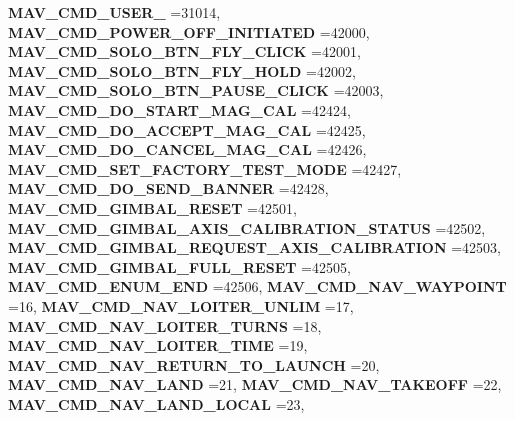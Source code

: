 \begin{DoxyCompactItemize}
\textbf{ M\+A\+V\+\_\+\+C\+M\+D\+\_\+\+U\+S\+E\+R\+\_} =31014, 
\newline
\textbf{ M\+A\+V\+\_\+\+C\+M\+D\+\_\+\+P\+O\+W\+E\+R\+\_\+\+O\+F\+F\+\_\+\+I\+N\+I\+T\+I\+A\+T\+ED} =42000, 
\textbf{ M\+A\+V\+\_\+\+C\+M\+D\+\_\+\+S\+O\+L\+O\+\_\+\+B\+T\+N\+\_\+\+F\+L\+Y\+\_\+\+C\+L\+I\+CK} =42001, 
\textbf{ M\+A\+V\+\_\+\+C\+M\+D\+\_\+\+S\+O\+L\+O\+\_\+\+B\+T\+N\+\_\+\+F\+L\+Y\+\_\+\+H\+O\+LD} =42002, 
\textbf{ M\+A\+V\+\_\+\+C\+M\+D\+\_\+\+S\+O\+L\+O\+\_\+\+B\+T\+N\+\_\+\+P\+A\+U\+S\+E\+\_\+\+C\+L\+I\+CK} =42003, 
\newline
\textbf{ M\+A\+V\+\_\+\+C\+M\+D\+\_\+\+D\+O\+\_\+\+S\+T\+A\+R\+T\+\_\+\+M\+A\+G\+\_\+\+C\+AL} =42424, 
\textbf{ M\+A\+V\+\_\+\+C\+M\+D\+\_\+\+D\+O\+\_\+\+A\+C\+C\+E\+P\+T\+\_\+\+M\+A\+G\+\_\+\+C\+AL} =42425, 
\textbf{ M\+A\+V\+\_\+\+C\+M\+D\+\_\+\+D\+O\+\_\+\+C\+A\+N\+C\+E\+L\+\_\+\+M\+A\+G\+\_\+\+C\+AL} =42426, 
\textbf{ M\+A\+V\+\_\+\+C\+M\+D\+\_\+\+S\+E\+T\+\_\+\+F\+A\+C\+T\+O\+R\+Y\+\_\+\+T\+E\+S\+T\+\_\+\+M\+O\+DE} =42427, 
\newline
\textbf{ M\+A\+V\+\_\+\+C\+M\+D\+\_\+\+D\+O\+\_\+\+S\+E\+N\+D\+\_\+\+B\+A\+N\+N\+ER} =42428, 
\textbf{ M\+A\+V\+\_\+\+C\+M\+D\+\_\+\+G\+I\+M\+B\+A\+L\+\_\+\+R\+E\+S\+ET} =42501, 
\textbf{ M\+A\+V\+\_\+\+C\+M\+D\+\_\+\+G\+I\+M\+B\+A\+L\+\_\+\+A\+X\+I\+S\+\_\+\+C\+A\+L\+I\+B\+R\+A\+T\+I\+O\+N\+\_\+\+S\+T\+A\+T\+US} =42502, 
\textbf{ M\+A\+V\+\_\+\+C\+M\+D\+\_\+\+G\+I\+M\+B\+A\+L\+\_\+\+R\+E\+Q\+U\+E\+S\+T\+\_\+\+A\+X\+I\+S\+\_\+\+C\+A\+L\+I\+B\+R\+A\+T\+I\+ON} =42503, 
\newline
\textbf{ M\+A\+V\+\_\+\+C\+M\+D\+\_\+\+G\+I\+M\+B\+A\+L\+\_\+\+F\+U\+L\+L\+\_\+\+R\+E\+S\+ET} =42505, 
\textbf{ M\+A\+V\+\_\+\+C\+M\+D\+\_\+\+E\+N\+U\+M\+\_\+\+E\+ND} =42506, 
\textbf{ M\+A\+V\+\_\+\+C\+M\+D\+\_\+\+N\+A\+V\+\_\+\+W\+A\+Y\+P\+O\+I\+NT} =16, 
\textbf{ M\+A\+V\+\_\+\+C\+M\+D\+\_\+\+N\+A\+V\+\_\+\+L\+O\+I\+T\+E\+R\+\_\+\+U\+N\+L\+IM} =17, 
\newline
\textbf{ M\+A\+V\+\_\+\+C\+M\+D\+\_\+\+N\+A\+V\+\_\+\+L\+O\+I\+T\+E\+R\+\_\+\+T\+U\+R\+NS} =18, 
\textbf{ M\+A\+V\+\_\+\+C\+M\+D\+\_\+\+N\+A\+V\+\_\+\+L\+O\+I\+T\+E\+R\+\_\+\+T\+I\+ME} =19, 
\textbf{ M\+A\+V\+\_\+\+C\+M\+D\+\_\+\+N\+A\+V\+\_\+\+R\+E\+T\+U\+R\+N\+\_\+\+T\+O\+\_\+\+L\+A\+U\+N\+CH} =20, 
\textbf{ M\+A\+V\+\_\+\+C\+M\+D\+\_\+\+N\+A\+V\+\_\+\+L\+A\+ND} =21, 
\newline
\textbf{ M\+A\+V\+\_\+\+C\+M\+D\+\_\+\+N\+A\+V\+\_\+\+T\+A\+K\+E\+O\+FF} =22, 
\textbf{ M\+A\+V\+\_\+\+C\+M\+D\+\_\+\+N\+A\+V\+\_\+\+L\+A\+N\+D\+\_\+\+L\+O\+C\+AL} =23, 

\end{DoxyCompactItemize}
